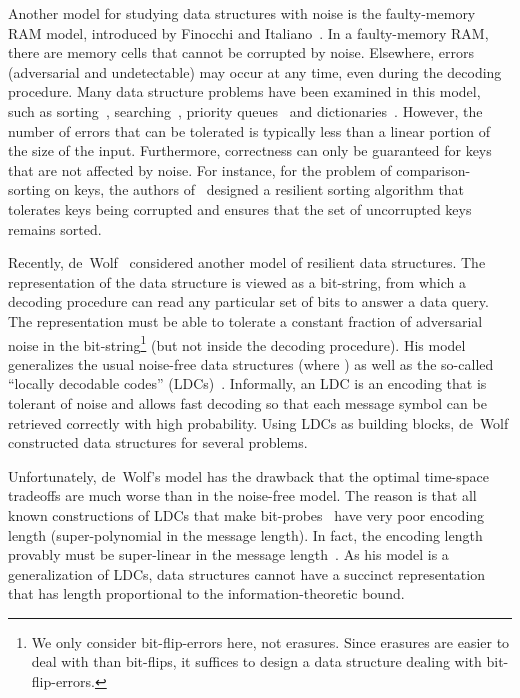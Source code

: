 \documentclass[11pt,english]{article}
\theoremstyle{definition}
\theoremstyle{remark}
\begin{document}
Another model for studying data structures with noise is the faulty-memory RAM model, 
introduced by Finocchi and Italiano~\cite{finocchi&italiano:faults}. 
In a faulty-memory RAM, there are  memory cells that cannot
be corrupted by noise. Elsewhere, errors (adversarial and undetectable)
may occur at any time, even during the decoding procedure.
Many data structure problems have been examined in this model, 
such as sorting~\cite{fgi:resilientsorting}, searching~\cite{fgi:resilientsearch},
priority queues~\cite{jmm:resilientpriority} and dictionaries~\cite{bffgijmm:resilientdict}.
However, the number of errors that can be tolerated is typically less than
a linear portion of the size of the input. Furthermore, correctness
can only be guaranteed for keys that are not affected by noise. For
instance, for the problem of comparison-sorting on  keys, the
authors of~\cite{fgi:resilientsorting} designed a resilient sorting
algorithm that tolerates  keys being corrupted and
ensures that the set of uncorrupted keys remains sorted.

Recently, de~Wolf~\cite{wolf:ecdata} considered another model of
resilient data structures. The representation of the data structure
is viewed as a bit-string, from which a decoding procedure can read
any particular set of bits to answer a data query. The representation
must be able to tolerate a constant fraction  of adversarial noise in the bit-string\footnote{We only consider bit-flip-errors here, not erasures. Since erasures
are easier to deal with than bit-flips, it suffices to design a data
structure dealing with bit-flip-errors.} 
(but not inside the decoding procedure). His model generalizes the
usual noise-free data structures (where ) as well as the
so-called ``locally decodable codes'' (LDCs)~\cite{katz&trevisan:ldc}.
Informally, an LDC is an encoding that is tolerant of noise and allows
fast decoding so that each message symbol can be retrieved correctly
with high probability. Using LDCs as building blocks, de~Wolf constructed
data structures for several problems. 

Unfortunately, de~Wolf's model has the drawback that the optimal
time-space tradeoffs are much worse than in the noise-free model.
The reason is that all known constructions of LDCs that make 
bit-probes~\cite{yekhanin:3ldcj,efremenko:ldc} have very poor encoding
length (super-polynomial in the message length). In fact, the encoding
length provably must be super-linear in the message length~\cite{katz&trevisan:ldc,kerenidis&wolf:qldcj,woodruff:ldclower}.
As his model is a generalization of LDCs, data structures cannot have
a succinct representation that has length proportional to the information-theoretic
bound.
\end{document}
